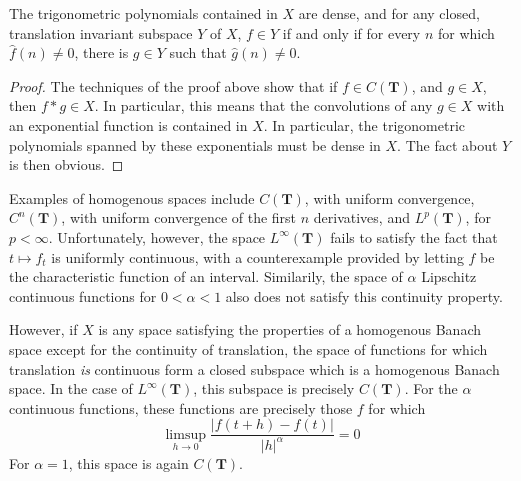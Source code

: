 \begin{corollary}
	The trigonometric polynomials contained in $X$ are dense, and for any closed, translation invariant subspace $Y$ of $X$, $f \in Y$ if and only if for every $n$ for which $\widehat{f}(n) \neq 0$, there is $g \in Y$ such that $\widehat{g}(n) \neq 0$.
\end{corollary}
\begin{proof}
	The techniques of the proof above show that if $f \in C(\mathbf{T})$, and $g \in X$, then $f * g \in X$. In particular, this means that the convolutions of any $g \in X$ with an exponential function is contained in $X$. In particular, the trigonometric polynomials spanned by these exponentials must be dense in $X$. The fact about $Y$ is then obvious.
\end{proof}

Examples of homogenous spaces include $C(\mathbf{T})$, with uniform convergence, $C^n(\mathbf{T})$, with uniform convergence of the first $n$ derivatives, and $L^p(\mathbf{T})$, for $p < \infty$. Unfortunately, however, the space $L^\infty(\mathbf{T})$ fails to satisfy the fact that $t \mapsto f_t$ is uniformly continuous, with a counterexample provided by letting $f$ be the characteristic function of an interval. Similarily, the space of $\alpha$ Lipschitz continuous functions for $0 < \alpha < 1$ also does not satisfy this continuity property.

However, if $X$ is any space satisfying the properties of a homogenous Banach space except for the continuity of translation, the space of functions for which translation {\it is} continuous form a closed subspace which is a homogenous Banach space. In the case of $L^\infty(\mathbf{T})$, this subspace is precisely $C(\mathbf{T})$. For the $\alpha$ continuous functions, these functions are precisely those $f$ for which
%
\[ \limsup_{h \to 0} \frac{|f(t+h) - f(t)|}{|h|^\alpha} = 0 \]
%
For $\alpha = 1$, this space is again $C(\mathbf{T})$.

